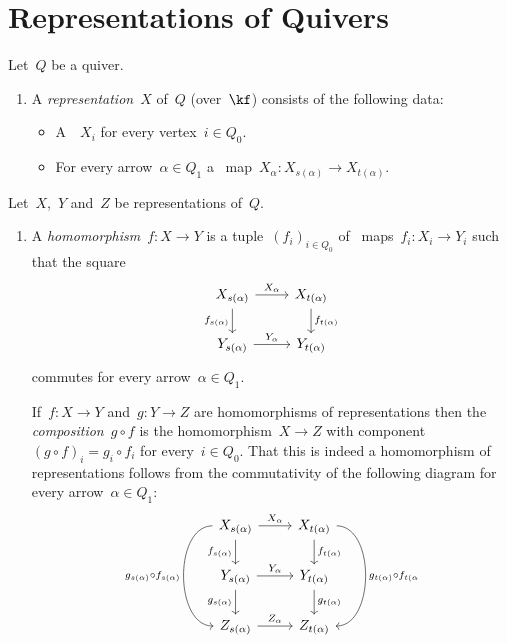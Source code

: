 \section{Representations of Quivers}


\begin{remarkdefinition}
  Let~$Q$ be a quiver.
  \begin{enumerate}
    \item
      A \emph{representation}~$X$ of~$Q$ (over~$\kf$) consists of the following data:
      \begin{itemize}
        \item
          A~{\module{$\kf$}}~$X_i$ for every vertex~$i \in Q_0$.
        \item
          For every arrow~$\alpha \in Q_1$ a~{\klin} map~$X_\alpha \colon X_{s(\alpha)} \to X_{t(\alpha)}$.
      \end{itemize}
  \end{enumerate}
  Let~$X$,~$Y$ and~$Z$ be representations of~$Q$.
  \begin{enumerate}[resume]
    \item
      A \emph{homomorphism}~$f \colon X \to Y$ is a tuple~$(f_i)_{i \in Q_0}$ of~{\klin} maps~$f_i \colon X_i \to Y_i$ such that the square
      \[
        \begin{tikzcd}
            X_{s(\alpha)}
            \arrow{r}[above]{X_\alpha}
            \arrow{d}[left]{f_{s(\alpha)}}
          & X_{t(\alpha)}
            \arrow{d}[right]{f_{t(\alpha)}}
          \\
            Y_{s(\alpha)}
            \arrow{r}[above]{Y_\alpha}
          & Y_{t(\alpha)}
        \end{tikzcd}
      \]
      commutes for every arrow~$\alpha \in Q_1$.
      
      If~$f \colon X \to Y$ and~$g \colon Y \to Z$ are homomorphisms of representations then the \emph{composition}~$g \circ f$ is the homomorphism~$X \to Z$ with component~$(g \circ f)_i = g_i \circ f_i$ for every~$i \in Q_0$.
      That this is indeed a homomorphism of representations follows from the commutativity of the following diagram for every arrow~$\alpha \in Q_1$:
      \[
        \begin{tikzcd}
            X_{s(\alpha)}
            \arrow{r}[above]{X_\alpha}
            \arrow{d}[left]{f_{s(\alpha)}}
            \arrow[bend right = 90]{dd}[left]{g_{s(\alpha)} \circ f_{s(\alpha)}}
          & X_{t(\alpha)}
            \arrow{d}[right]{f_{t(\alpha)}}
            \arrow[bend left = 90]{dd}[right]{g_{t(\alpha)} \circ f_{t(\alpha}}
          \\
            Y_{s(\alpha)}
            \arrow{r}[above]{Y_\alpha}
            \arrow{d}[left]{g_{s(\alpha)}}
          & Y_{t(\alpha)}
            \arrow{d}[right]{g_{t(\alpha)}}
          \\
            Z_{s(\alpha)}
            \arrow{r}[above]{Z_\alpha}
          & Z_{t(\alpha)}
        \end{tikzcd}
      \]
      

\end{enumerate}
\end{remarkdefinition}
